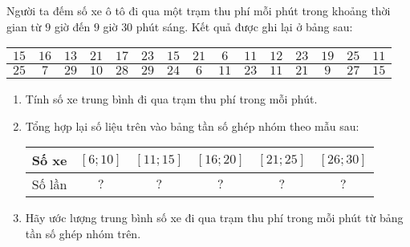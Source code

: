 \begin{bt}%
	Người ta đếm số xe ô tô đi qua một trạm thu phí mỗi phút trong khoảng thời gian từ $9$ giờ đến $9$ giờ $30$ phút sáng. Kết quả được ghi lại ở bảng sau:
	\begin{center}
		\begin{tabular}{|c|c|c|c|c|c|c|c|c|c|c|c|c|c|c|}
			\hline $15$ & $16$ & $13$ & $21$ & $17$ & $23$ & $15$ & $21$ & $6$  & $11$ & $12$ & $23$ & $19$ & $25$ & $11$ \\
			\hline $25$ & $7$  & $29$ & $10$ & $28$ & $29$ & $24$ & $6$  & $11$ & $23$ & $11$ & $21$ & $9$  & $27$ & $15$ \\
			\hline
		\end{tabular}
	\end{center}
	\begin{enumerate}
		\item Tính số xe trung bình đi qua trạm thu phí trong mỗi phút.
		\item Tổng hợp lại số liệu trên vào bảng tần số ghép nhóm theo mẫu sau:
		      \begin{center}
			      \begin{tabular}{|c|c|c|c|c|c|}
				      \hline Số xe  & {$[6; 10]$} & {$[11; 15]$} & {$[16; 20]$} & {$[21; 25]$} & {$[26; 30]$} \\
				      \hline Số lần & $?$         & $?$          & $?$          & $?$          & $?$          \\
				      \hline
			      \end{tabular}
		      \end{center}
		\item Hãy ước lượng trung bình số xe đi qua trạm thu phí trong mỗi phút từ bảng tần số ghép nhóm trên.
	\end{enumerate}
	\loigiai{
		\begin{enumerate}
			\item

\end{enumerate}}
\end{bt}
